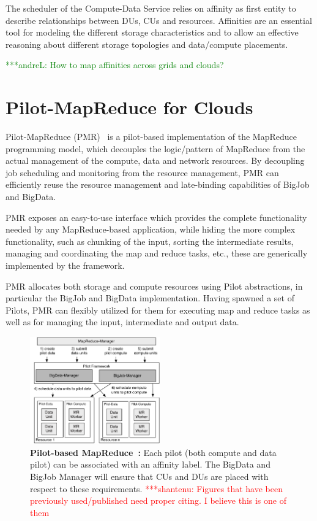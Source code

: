\documentclass[times]{cpeauth}
\newcommand{\jhanote}[1]{ {\textcolor{red} { ***shantenu: #1 }}}
\newcommand{\alnote}[1]{ {\textcolor{green} { ***andreL: #1 }}}
\newcommand{\alnote}[1]{}
\newcommand{\jhanote}[1]{}
\newcommand{\pilot}{Pilot\xspace}
\newcommand{\pilots}{Pilots\xspace}
\newcommand{\computedataservice}{Compute-Data Service\xspace}
\newcommand{\dus}{DUs\xspace}
\newcommand{\cus}{CUs\xspace}
\begin{document}
The scheduler of the \computedataservice relies on affinity as first entity to
describe relationships between \dus, \cus and resources. Affinities are an
essential tool for modeling the different storage characteristics and to allow
an effective reasoning about different storage topologies and data/compute
placements.

\alnote{How to map affinities across grids and clouds?}

\section{Pilot-MapReduce for Clouds}

Pilot-MapReduce (PMR)~\cite{Mantha:2012:PEF:2287016.2287020} is a pilot-based
implementation of the MapReduce programming model, which decouples the
logic/pattern of MapReduce from the actual management of the compute, data and
network resources. By decoupling job scheduling and monitoring from the
resource management, PMR can efficiently reuse the resource management and
late-binding capabilities of BigJob and BigData.

PMR exposes an easy-to-use interface which provides the complete
functionality needed by any MapReduce-based application, while hiding
the more complex functionality, such as chunking of the input, sorting
the intermediate results, managing and coordinating the map and reduce
tasks, etc., these are generically implemented by the
framework.

PMR allocates both storage and compute resources using \pilot abstractions, in
particular the BigJob and BigData implementation. Having spawned a set of
\pilots, PMR can flexibly utilized for them for executing map and reduce tasks
as well as for managing the input, intermediate and output data.


\begin{figure}[t]
	\centering
	\includegraphics[width=0.5\textwidth]{figures/mr-arch.pdf}
	\caption{\textbf{Pilot-based 
		MapReduce~\cite{Mantha:2012:PEF:2287016.2287020}:} Each pilot (both
          compute and data pilot) can be associated with an affinity
          label. The BigData and BigJob Manager will ensure that CUs
          and DUs are placed with respect to these
          requirements. \jhanote{Figures that have been previously
            used/published need proper citing. I believe this is one of them}}
	\label{fig:figures_mapreduce-pilotdata}
\end{figure}
\end{document}
